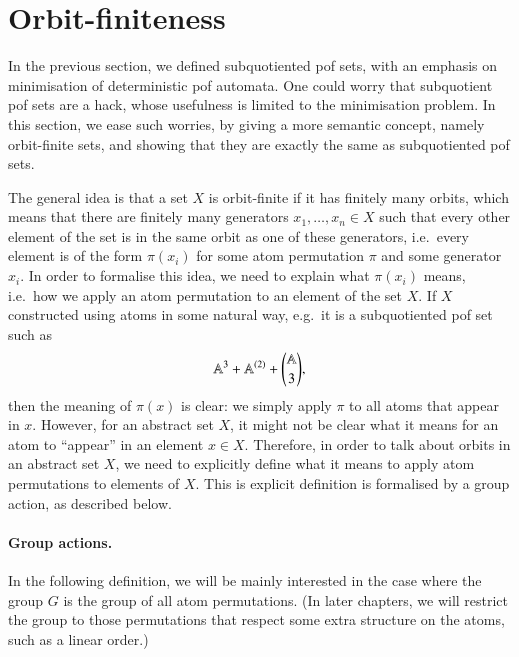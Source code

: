 \exercisepart

\section{Orbit-finiteness}
\label{sec:orbit-finiteness-equality}
In the previous section, we defined subquotiented pof sets, with an emphasis on minimisation of deterministic pof automata. 
One could worry that subquotient pof sets are a hack, whose usefulness is limited to the  minimisation problem. In this section, we ease such worries, by giving a more semantic concept, namely orbit-finite sets, and showing that they are exactly the same as subquotiented pof sets.

The general idea is that a set $X$ is orbit-finite if it has finitely many orbits, which means that there are finitely many generators  $x_1,\ldots,x_n \in X$ such that every other element of the set is in the same orbit as one of these generators, i.e.~every element is of the form $\pi(x_i)$ for some atom permutation $\pi$ and some generator $x_i$.  In order to formalise this idea, we need to explain what $\pi(x_i)$ means, i.e.~how we apply an atom permutation to an element of the set $X$. If $X$ constructed using atoms in some natural way, e.g.~it is a subquotiented pof set such as \begin{align*}
\mathbb A^3 + \mathbb A^{(2)} + {\mathbb A \choose 3},
\end{align*}
then the meaning of $\pi(x)$ is clear: we simply apply $\pi$ to all atoms that appear in $x$. However, for an abstract set $X$, it might not be clear what it means for an atom to ``appear'' in an element $x \in X$.  Therefore, in order to talk about orbits in an abstract set $X$, we need to explicitly define what it means to apply atom permutations to elements of $X$. This is explicit definition is formalised by a group action, as described below. 


\paragraph*{Group actions.} In the following definition, we will be mainly interested in the case where the group $G$ is the group of all atom permutations.  (In later chapters, we will restrict the group to those permutations that respect some extra structure on the atoms, such as a linear order.) 



